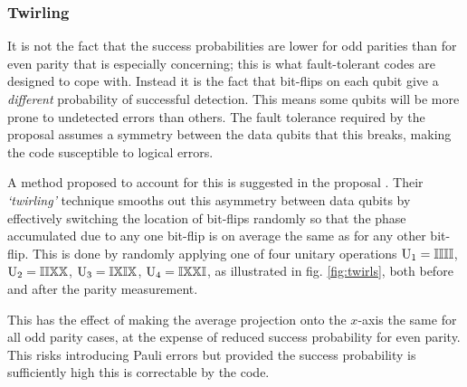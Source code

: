 
\subsubsection{Twirling}

It is not the fact that the success probabilities are lower for odd parities than for even parity that is especially concerning; this is what fault-tolerant codes are designed to cope with. Instead it is the fact that bit-flips on each qubit give a \emph{different} probability of successful detection. This means some qubits will be more prone to undetected errors than others. The fault tolerance required by the proposal assumes a symmetry between the data qubits that this breaks, making the code susceptible to logical errors.

A method proposed to account for this is suggested in the proposal \cite{OGorman2016}. Their \emph{`twirling'} technique smooths out this asymmetry between data qubits by effectively switching the location of bit-flips randomly so that the phase accumulated due to any one bit-flip is on average the same as for any other bit-flip. This is done by randomly applying one of four unitary operations $\mathrm{U_1 = \mathbb{I}\mathbb{I}\mathbb{I}\mathbb{I}}$, $\mathrm{U_2 = \mathbb{I}\mathbb{I}\mathbb{X}\mathbb{X}}$, $\mathrm{U_3 = \mathbb{I}\mathbb{X}\mathbb{I}\mathbb{X}}$, $\mathrm{U_4 = \mathbb{I}\mathbb{X}\mathbb{X}\mathbb{I}}$, as illustrated in fig. \ref{fig:twirls}, both before and after the parity measurement.

This has the effect of making the average projection onto the $x$-axis the same for all odd parity cases, at the expense of reduced success probability for even parity. This risks introducing Pauli errors \cite{OGorman2016} but provided the success probability is sufficiently high this is correctable by the code.


